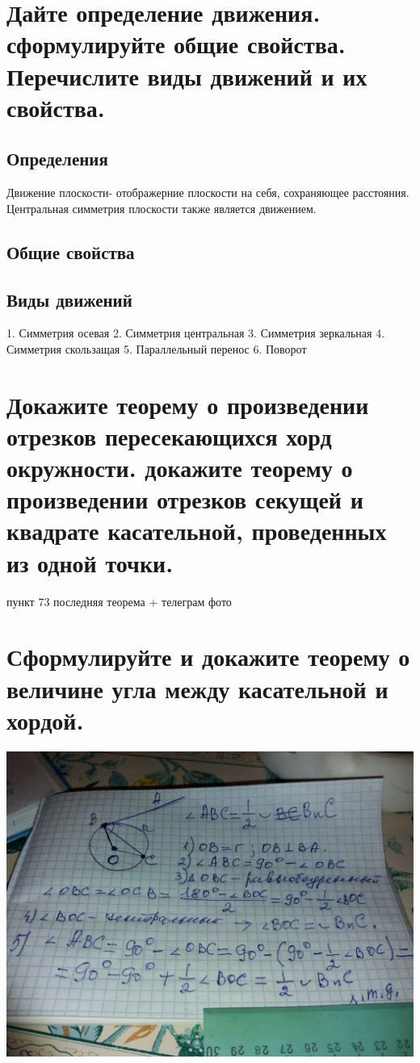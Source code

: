 \documentclass[12pt, letterpaper]{article}
\begin{document}
\section {Дайте определение движения. сформулируйте общие свойства. Перечислите виды движений и их свойства.}
\subsection{Определения}
Движение плоскости- отображерние плоскости на себя, сохраняющее расстояния. \\
Центральная симметрия плоскости также является движением. \\
\subsection{Общие свойства}

\subsection{Виды движений}
1. Симметрия осевая
2. Симметрия центральная
3. Симметрия зеркальная
4. Симметрия скользащая
5. Параллельный перенос
6. Поворот




\section {Докажите теорему о произведении отрезков пересекающихся хорд окружности. докажите теорему о произведении отрезков секущей и квадрате касательной, проведенных из одной точки.}
пункт 73 последняя теорема + телеграм фото

\section {Сформулируйте и докажите теорему о величине угла между касательной и хордой.}
\includegraphics[scale=0.3]{asset-2.png} \\
\end{document}
